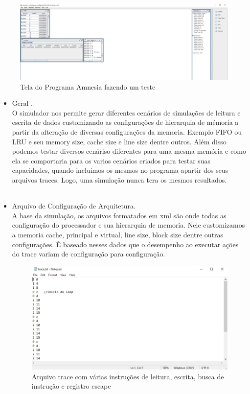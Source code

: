 \documentclass[conference]{IEEEtran}
\begin{document}
\begin{figure}[H]
  \includegraphics[width=\linewidth]{Amnesia_screen.png}
  \caption{Tela do Programa Amnesia fazendo um teste}
  \label{fig:Tela do Programa Amnesia fazendo um teste}
\end{figure}

\begin{itemize}
\item  
Geral . \\
O simulador nos permite gerar diferentes cenários de simulações de leitura e escrita de dados
customizando as configurações de hierarquia de mémoria a partir da alteração de diversas configurações da memoria. Exemplo FIFO ou LRU e seu memory size, cache size e line size dentre outros. Além disso podemos testar diversos cenáriso diferentes para uma mesma memória e como ela se comportaria para os varios cenários criados para testar suas capacidades, quando incluimos os mesmos no programa apartir dos seus arquivos traces. Logo, uma simulação nunca tera os mesmos resultados.\\
\\

\item Arquivo de Configuração de Arquitetura. \\
A base da simulação, os arquivos formatados em xml são onde todas as configuração do processador e sua hierarquia de memoria. Nele customizamos a memoria cache, principal e virtual, line size, block size dentre outras configurações. È baseado nesses dados que o desempenho ao executar ações do trace variam de configuração para configuração.
\\
\begin{figure}[H]
  \includegraphics[width=\linewidth]{trace.jpg}
  \caption{Arquivo trace com várias instruções de leitura, escrita, busca de instrução e registro escape}
  \label{fig:trace}
\end{figure}


\end{itemize}
\end{document}
